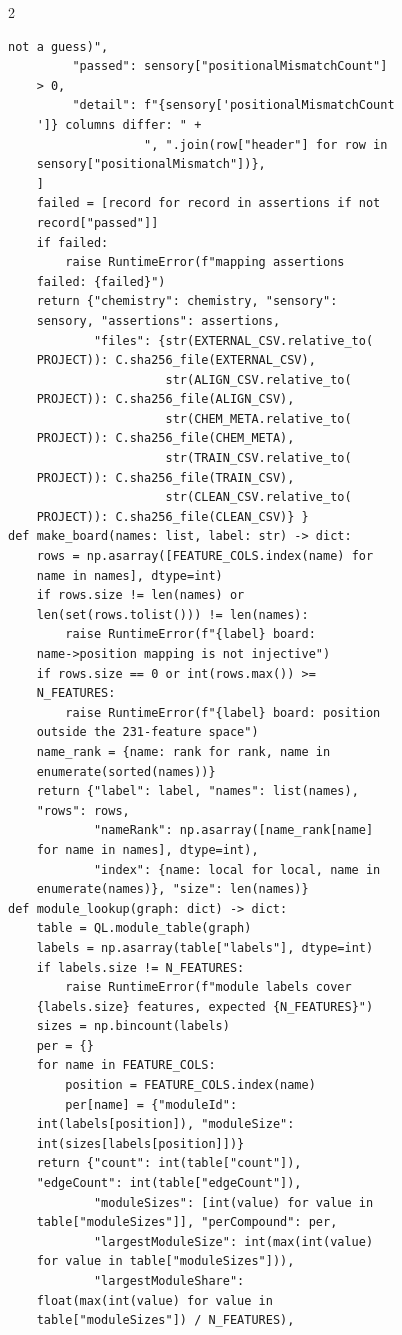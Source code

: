 \begin{multicols}{2}
\begin{Verbatim}[fontsize=\scriptsize]
    not a guess)",
         "passed": sensory["positionalMismatchCount"]
    > 0,
         "detail": f"{sensory['positionalMismatchCount
    ']} columns differ: " +
                   ", ".join(row["header"] for row in
    sensory["positionalMismatch"])},
    ]
    failed = [record for record in assertions if not
    record["passed"]]
    if failed:
        raise RuntimeError(f"mapping assertions
    failed: {failed}")
    return {"chemistry": chemistry, "sensory":
    sensory, "assertions": assertions,
            "files": {str(EXTERNAL_CSV.relative_to(
    PROJECT)): C.sha256_file(EXTERNAL_CSV),
                      str(ALIGN_CSV.relative_to(
    PROJECT)): C.sha256_file(ALIGN_CSV),
                      str(CHEM_META.relative_to(
    PROJECT)): C.sha256_file(CHEM_META),
                      str(TRAIN_CSV.relative_to(
    PROJECT)): C.sha256_file(TRAIN_CSV),
                      str(CLEAN_CSV.relative_to(
    PROJECT)): C.sha256_file(CLEAN_CSV)} }
def make_board(names: list, label: str) -> dict:
    rows = np.asarray([FEATURE_COLS.index(name) for
    name in names], dtype=int)
    if rows.size != len(names) or
    len(set(rows.tolist())) != len(names):
        raise RuntimeError(f"{label} board:
    name->position mapping is not injective")
    if rows.size == 0 or int(rows.max()) >=
    N_FEATURES:
        raise RuntimeError(f"{label} board: position
    outside the 231-feature space")
    name_rank = {name: rank for rank, name in
    enumerate(sorted(names))}
    return {"label": label, "names": list(names),
    "rows": rows,
            "nameRank": np.asarray([name_rank[name]
    for name in names], dtype=int),
            "index": {name: local for local, name in
    enumerate(names)}, "size": len(names)}
def module_lookup(graph: dict) -> dict:
    table = QL.module_table(graph)
    labels = np.asarray(table["labels"], dtype=int)
    if labels.size != N_FEATURES:
        raise RuntimeError(f"module labels cover
    {labels.size} features, expected {N_FEATURES}")
    sizes = np.bincount(labels)
    per = {}
    for name in FEATURE_COLS:
        position = FEATURE_COLS.index(name)
        per[name] = {"moduleId":
    int(labels[position]), "moduleSize":
    int(sizes[labels[position]])}
    return {"count": int(table["count"]),
    "edgeCount": int(table["edgeCount"]),
            "moduleSizes": [int(value) for value in
    table["moduleSizes"]], "perCompound": per,
            "largestModuleSize": int(max(int(value)
    for value in table["moduleSizes"])),
            "largestModuleShare":
    float(max(int(value) for value in
    table["moduleSizes"]) / N_FEATURES),

\end{Verbatim}
\end{multicols}
